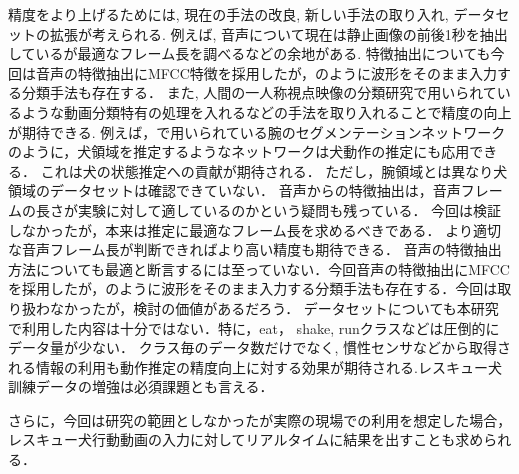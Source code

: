 \documentclass[MIRU,submit,english]{miru2019e}
\begin{document}
精度をより上げるためには, 現在の手法の改良, 新しい手法の取り入れ, データセットの拡張が考えられる.
例えば, 音声について現在は静止画像の前後1秒を抽出しているが最適なフレーム長を調べるなどの余地がある.
特徴抽出についても今回は音声の特徴抽出にMFCC特徴を採用したが，\cite{aytar2016soundnet}のように波形をそのまま入力する分類手法も存在する．
また, 人間の一人称視点映像の分類研究で用いられているような動画分類特有の処理を入れるなどの手法を取り入れることで精度の向上が期待できる.
例えば，\cite{minghuang2016fpar}で用いられている腕のセグメンテーションネットワークのように，犬領域を推定するようなネットワークは犬動作の推定にも応用できる．
これは犬の状態推定への貢献が期待される．
ただし，腕領域とは異なり犬領域のデータセットは確認できていない．
音声からの特徴抽出は，音声フレームの長さが実験に対して適しているのかという疑問も残っている．
今回は検証しなかったが，本来は推定に最適なフレーム長を求めるべきである．
より適切な音声フレーム長が判断できればより高い精度も期待できる．
音声の特徴抽出方法についても最適と断言するには至っていない．今回音声の特徴抽出にMFCCを採用したが，\cite{aytar2016soundnet}のように波形をそのまま入力する分類手法も存在する．今回は取り扱わなかったが，検討の価値があるだろう．
データセットについても本研究で利用した内容は十分ではない．特に，eat， shake, runクラスなどは圧倒的にデータ量が少ない．
クラス毎のデータ数だけでなく, 慣性センサなどから取得される情報の利用も動作推定の精度向上に対する効果が期待される.レスキュー犬訓練データの増強は必須課題とも言える．

さらに，今回は研究の範囲としなかったが実際の現場での利用を想定した場合，レスキュー犬行動動画の入力に対してリアルタイムに結果を出すことも求められる．



\end{document}

